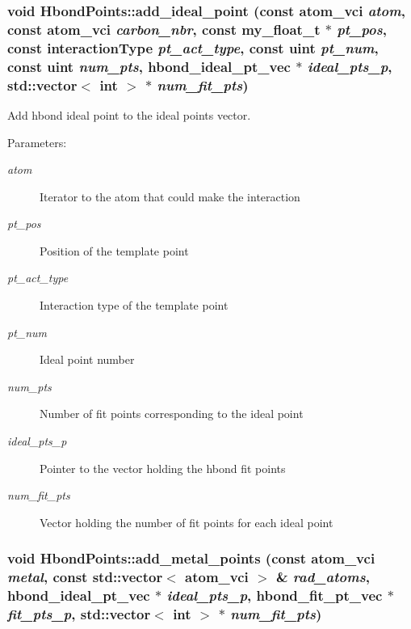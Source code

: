 \subsubsection{\setlength{\rightskip}{0pt plus 5cm}void Hbond\-Points::add\_\-ideal\_\-point (const atom\_\-vci {\em atom}, const atom\_\-vci {\em carbon\_\-nbr}, const my\_\-float\_\-t $\ast$ {\em pt\_\-pos}, const interaction\-Type {\em pt\_\-act\_\-type}, const uint {\em pt\_\-num}, const uint {\em num\_\-pts}, \bf{hbond\_\-ideal\_\-pt\_\-vec} $\ast$ {\em ideal\_\-pts\_\-p}, std::vector$<$ int $>$ $\ast$ {\em num\_\-fit\_\-pts})\hspace{0.3cm}{\tt  [private]}}\label{classASCbase_1_1HbondPoints_7a16d0105816da029d43b16136fa67f8}


Add hbond ideal point to the ideal points vector. 

\begin{Desc}
\item[Parameters:]
\begin{description}
\item[{\em atom}]Iterator to the atom that could make the interaction \item[{\em pt\_\-pos}]Position of the template point \item[{\em pt\_\-act\_\-type}]Interaction type of the template point \item[{\em pt\_\-num}]Ideal point number \item[{\em num\_\-pts}]Number of fit points corresponding to the ideal point \item[{\em ideal\_\-pts\_\-p}]Pointer to the vector holding the hbond fit points \item[{\em num\_\-fit\_\-pts}]Vector holding the number of fit points for each ideal point \end{description}
\end{Desc}
\subsubsection{\setlength{\rightskip}{0pt plus 5cm}void Hbond\-Points::add\_\-metal\_\-points (const atom\_\-vci {\em metal}, const std::vector$<$ atom\_\-vci $>$ \& {\em rad\_\-atoms}, \bf{hbond\_\-ideal\_\-pt\_\-vec} $\ast$ {\em ideal\_\-pts\_\-p}, \bf{hbond\_\-fit\_\-pt\_\-vec} $\ast$ {\em fit\_\-pts\_\-p}, std::vector$<$ int $>$ $\ast$ {\em num\_\-fit\_\-pts})\hspace{0.3cm}{\tt  [private]}}\label{classASCbase_1_1HbondPoints_a51c90df30b66be9745fe00ea616d5be}


